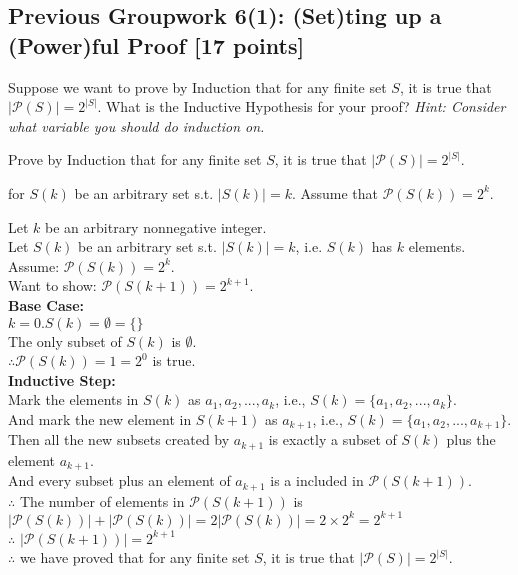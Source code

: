 \documentclass[12pt]{exam}
\begin{document}
\subsection*{Previous Groupwork 6(1): (Set)ting up a (Power)ful Proof [17 points]}
\begin{qparts}
    \item Suppose we want to prove by Induction that for any finite set $S$, it is true that $|\mathcal{P}(S)| = 2^{|S|}$. What is the Inductive Hypothesis for your proof? \emph{Hint: Consider what variable you should do induction on.}
    \item Prove by Induction that for any finite set $S$, it is true that $|\mathcal{P}(S)| = 2^{|S|}$.
\end{qparts}
\begin{solution}
    \begin{qparts}
        \item 
        for $S(k)$ be an arbitrary set s.t. $|S(k)| = k$.
        Assume that $\mathcal{P}(S(k)) = 2^k $.
        \item
        Let $k$ be an arbitrary nonnegative integer.\\
        Let $S(k)$ be an arbitrary set s.t. 
        $|S(k)| = k$, i.e. $S(k)$ has $k$ elements.\\
        Assume: $\mathcal{P}(S(k)) = 2^k $.\\
        Want to show: $\mathcal{P}(S(k+1)) = 2^{k+1}.$\\
        
        \textbf{Base Case:}\\
        $k = 0. S(k) = \emptyset = \{\}$\\
        The only subset of $S(k)$ is $\emptyset$.\\
        $\therefore \mathcal{P}(S(k)) = 1 = 2^0$ is true.\\
        
        \textbf{Inductive Step:}\\
        Mark the elements in $S(k)$ as $a_1,a_2,...,a_k$, i.e., $S(k) = \{a_1, a_2, ..., a_k\}$.\\
        And mark the new element in $S(k+1)$ as $a_{k+1}$, i.e., $S(k) = \{a_1, a_2, ..., a_{k+1}\}$.\\
        Then all the new subsets created by $a_{k+1}$ is exactly a subset of $S(k)$ plus the element $a_{k+1}$.\\
        And every subset plus an element of $a_{k+1}$ is a included in $\mathcal{P}(S(k+1))$.\\
        $\therefore$ The number of elements in $\mathcal{P}(S(k+1))$ is $|\mathcal{P}(S(k))| + |\mathcal{P}(S(k))| = 2|\mathcal{P}(S(k))| = 2 \times 2^k = 2^{k+1}$\\
        $\therefore$ $|\mathcal{P}(S(k+1))| = 2^{k+1}$\\
        $\therefore$ we have proved that for any finite set $S$, it is true that $|\mathcal{P}(S)| = 2^{|S|}$.

    \end{qparts}

\end{solution}
\end{document}
